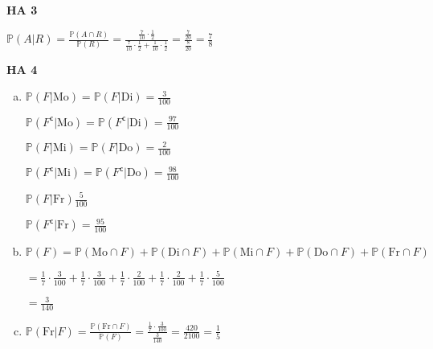 \documentclass[a4paper,12pt]{article}
\newcommand{\Aufgabe}[1]{
        {
        \vspace*{0.5cm}
        \textbf{HA #1}
        \vspace*{0.2cm}
    }
}
\begin{document}
    \Aufgabe{3}

    $ \displaystyle \mathbb{P}(A | R) = \frac{\mathbb{P}(A \cap R)}{\mathbb{P}(R)} = \frac{\frac{7}{10} \cdot \frac{1}{2}}{\frac{7}{10} \cdot \frac{1}{2} + \frac{1}{10} \cdot \frac{1}{2}} = \frac{\frac{7}{20}}{\frac{8}{20}} = \frac{7}{8} $

    \newpage 

    \Aufgabe{4}
    \begin{enumerate}[(a)]
        \item

        $ \displaystyle \mathbb{P}(F | \text{Mo}) = \mathbb{P}(F | \text{Di}) = \frac{3}{100} $

        $ \displaystyle \mathbb{P}(F^{\mathsf{c}} | \text{Mo}) = \mathbb{P}(F^{\mathsf{c}} | \text{Di}) = \frac{97}{100} $

        $ \displaystyle \mathbb{P}(F | \text{Mi}) = \mathbb{P}(F | \text{Do}) = \frac{2}{100} $

        $ \displaystyle \mathbb{P}(F^{\mathsf{c}} | \text{Mi}) = \mathbb{P}(F^{\mathsf{c}} | \text{Do}) = \frac{98}{100} $

        $ \displaystyle \mathbb{P}(F | \text{Fr}) \frac{5}{100} $

        $ \displaystyle \mathbb{P}(F^{\mathsf{c}} | \text{Fr}) = \frac{95}{100} $

        \item

        $ \displaystyle\mathbb{P}(F) = \mathbb{P}(\text{Mo} \cap F) + \mathbb{P}(\text{Di} \cap F) + \mathbb{P}(\text{Mi} \cap F) + \mathbb{P}(\text{Do} \cap F) + \mathbb{P}(\text{Fr} \cap F)  $
        
        $ \displaystyle = \frac{1}{7} \cdot \frac{3}{100} + \frac{1}{7} \cdot \frac{3}{100} + \frac{1}{7} \cdot \frac{2}{100} + \frac{1}{7} \cdot \frac{2}{100} + \frac{1}{7} \cdot \frac{5}{100} $

        $ \displaystyle = \frac{3}{140} $

        \item

        $ \displaystyle \mathbb{P}(\text{Fr} | F) = \frac{\mathbb{P}(\text{Fr} \cap F)}{\mathbb{P}(F)} = \frac{\frac{1}{7} \cdot \frac{3}{100}}{\frac{3}{140}} = \frac{420}{2100} = \frac{1}{5} $
    \end{enumerate}
\end{document}
